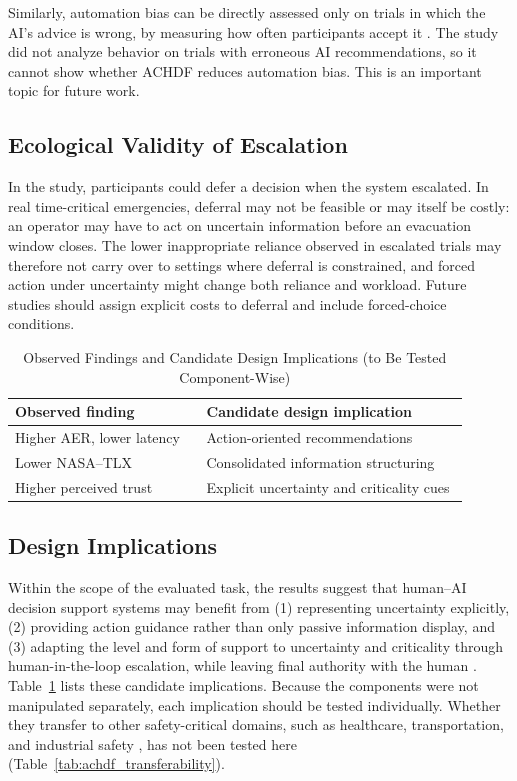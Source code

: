 \documentclass[journal]{IEEEtran}
\theoremstyle{plain}
\theoremstyle{definition}
\begin{document}
Similarly, automation bias can be directly assessed only on trials in which the AI's advice is wrong, by measuring how often participants accept it \cite{Parasuraman2010}. The study did not analyze behavior on trials with erroneous AI recommendations, so it cannot show whether ACHDF reduces automation bias. This is an important topic for future work.

\subsection{Ecological Validity of Escalation}
In the study, participants could defer a decision when the system escalated. In real time-critical emergencies, deferral may not be feasible or may itself be costly: an operator may have to act on uncertain information before an evacuation window closes. The lower inappropriate reliance observed in escalated trials may therefore not carry over to settings where deferral is constrained, and forced action under uncertainty might change both reliance and workload. Future studies should assign explicit costs to deferral and include forced-choice conditions.

    \begin{table}[t]
        \caption{Observed Findings and Candidate Design Implications (to Be Tested Component-Wise)}
        \label{tab:design_implications}
        \centering
        \begin{tabular}{p{0.38\linewidth} p{0.52\linewidth}}
            \toprule
            Observed finding & Candidate design implication \\
            \midrule
            Higher AER, lower latency & Action-oriented recommendations \\
            Lower NASA--TLX & Consolidated information structuring \\
            Higher perceived trust & Explicit uncertainty and criticality cues \\
            \bottomrule
        \end{tabular}
    \end{table}

\subsection{Design Implications}
Within the scope of the evaluated task, the results suggest that human--AI decision support systems may benefit from (1) representing uncertainty explicitly, (2) providing action guidance rather than only passive information display, and (3) adapting the level and form of support to uncertainty and criticality through human-in-the-loop escalation, while leaving final authority with the human \cite{Assaad2023TAS,Zhang2022THMS,Bach2024Access,Parasuraman2000LOA}. Table~\ref{tab:design_implications} lists these candidate implications. Because the components were not manipulated separately, each implication should be tested individually. Whether they transfer to other safety-critical domains, such as healthcare, transportation, and industrial safety \cite{PerezCerrolaza2024CSUR,Farhan2025TCE}, has not been tested here (Table~\ref{tab:achdf_transferability}).
\end{document}
